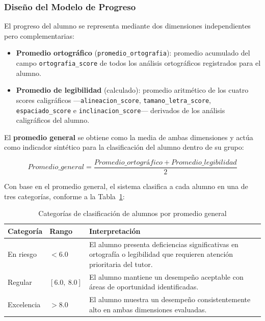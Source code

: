 \subsubsection{Diseño del Modelo de Progreso}

El progreso del alumno se representa mediante dos dimensiones
independientes pero complementarias:

\begin{itemize}
    \item \textbf{Promedio ortográfico} (\texttt{promedio\_ortografia}):
    promedio acumulado del campo \texttt{ortografia\_score} de todos los
    análisis ortográficos registrados para el alumno.

    \item \textbf{Promedio de legibilidad} (calculado): promedio aritmético
    de los cuatro scores caligráficos —\texttt{alineacion\_score},
    \texttt{tamano\_letra\_score}, \texttt{espaciado\_score} e
    \texttt{inclinacion\_score}— derivados de los análisis caligráficos
    del alumno.
\end{itemize}

El \textbf{promedio general} se obtiene como la media de ambas
dimensiones y actúa como indicador sintético para la clasificación del
alumno dentro de su grupo:

\begin{equation}
    Promedio\_general = \frac{Promedio\_ortográfico +
    Promedio\_legibilidad}{2}
    \label{eq:promedio-general}
\end{equation}

Con base en el promedio general, el sistema clasifica a cada alumno en
una de tres categorías, conforme a la Tabla~\ref{tab:categorias-progreso}:

\begin{table}[H]
\centering
\caption{Categorías de clasificación de alumnos por promedio general}
\label{tab:categorias-progreso}
\begin{tabular}{|l|l|p{7cm}|}
\hline
\textbf{Categoría} & \textbf{Rango} & \textbf{Interpretación} \\
\hline
En riesgo   & $< 6.0$         & El alumno presenta deficiencias significativas en
                                 ortografía o legibilidad que requieren atención
                                 prioritaria del tutor. \\
Regular     & $[6.0, \ 8.0]$  & El alumno mantiene un desempeño aceptable con
                                 áreas de oportunidad identificadas. \\
Excelencia  & $> 8.0$         & El alumno muestra un desempeño consistentemente
                                 alto en ambas dimensiones evaluadas. \\
\hline
\end{tabular}
\end{table}

